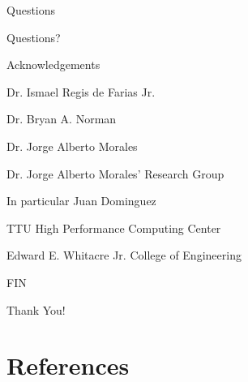 \documentclass[professionalfonts]{beamer}
\newcommand{\SubItem}[1]{
    {\setlength\itemindent{15pt} \item[*] #1}
}
\begin{document}
\begin{frame}{Questions}
	\begin{center}
		\Huge Questions?
	\end{center}
\end{frame}


\begin{frame}{Acknowledgements}
	\begin{itemize}
		\item Dr. Ismael Regis de Farias Jr.
		\item Dr. Bryan A. Norman
		\item Dr. Jorge Alberto Morales
		\item Dr. Jorge Alberto Morales' Research Group
			\SubItem {In particular Juan Dominguez}
		\item TTU High Performance Computing Center
		\item Edward E. Whitacre Jr. College of Engineering
	\end{itemize}
\end{frame}


\begin{frame}{FIN}
	\begin{center}
		\Huge Thank You!
	\end{center}
\end{frame}




\section{\textbf{References}}

\end{document}
